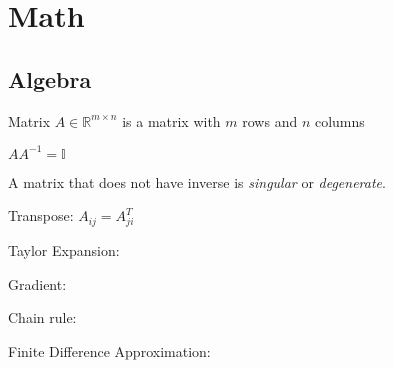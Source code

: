 \section{Math}
\subsection{Algebra}

Matrix $A \in\mathbb R^{m\times n}$ is a matrix with $m$ rows and $n$ columns

$AA^{-1}=\mathbb{I}$

A matrix that does not have inverse is \emph{singular} or \emph{degenerate}.

Transpose: $A_{ij} = A_{ji}^T$

Taylor Expansion:

Gradient:

Chain rule:

Finite Difference Approximation:

